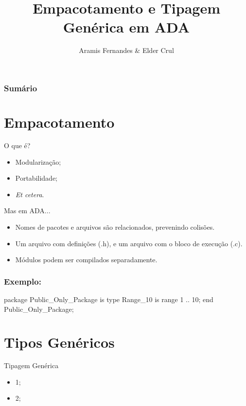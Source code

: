 \documentclass{beamer}
\title{Empacotamento e Tipagem Genérica em ADA}
\author{Aramis Fernandes \& Elder Crul}
\begin{document}
    \frame{\titlepage}

    \frame
    {
        \frametitle{Sumário}
        \tableofcontents
    }


    \section{Empacotamento}

    \begin{frame}{O que é?}
        \begin{itemize}
            \item<1-> Modularização;
            \item<2-> Portabilidade;
            \item<3-> \textit{Et cetera}.
        \end{itemize}
    \end{frame}

    \begin{frame}{Mas em ADA...}
        \begin{itemize}
            \item<1-|alert@1>Nomes de pacotes e arquivos são relacionados,
            prevenindo colisões.
            \item<2-> Um arquivo com definições (.h), e um arquivo com o bloco de
            execução (.c).
            \item<3-> Módulos podem ser compilados separadamente.
        \end{itemize}
    \end{frame}

    \begin{frame}[fragile]
        \frametitle{Exemplo:}
         package Public\_Only\_Package is
             type Range\_10 is range 1 .. 10;
             end Public\_Only\_Package;
    \end{frame}


    \section{Tipos Genéricos}
    \begin{frame}{Tipagem Genérica}
        \begin{itemize}
            \item<1-> 1;
            \item<2-> 2;
        \end{itemize}
    \end{frame}
\end{document}
